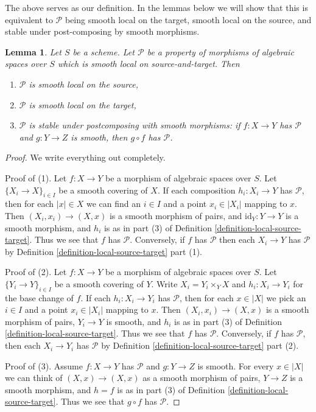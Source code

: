 \documentclass{stacks-project}
\theoremstyle{plain}
\newtheorem{lemma}[subsection]{Lemma}
\theoremstyle{definition}
\theoremstyle{remark}
\numberwithin{equation}{subsection}
\begin{document}
\noindent
The above serves as our definition. In the lemmas below we will show that
this is equivalent to $\mathcal{P}$ being smooth local on the target,
smooth local on the source, and stable under post-composing by smooth morphisms.

\begin{lemma}
\label{lemma-local-source-target-implies}
Let $S$ be a scheme.
Let $\mathcal{P}$ be a property of morphisms of algebraic spaces over $S$
which is smooth local on source-and-target. Then
\begin{enumerate}
\item $\mathcal{P}$ is smooth local on the source,
\item $\mathcal{P}$ is smooth local on the target,
\item $\mathcal{P}$ is stable under postcomposing with smooth morphisms:
if $f : X \to Y$ has $\mathcal{P}$ and $g : Y \to Z$ is smooth, then
$g \circ f$ has $\mathcal{P}$.
\end{enumerate}
\end{lemma}

\begin{proof}
We write everything out completely.

\medskip\noindent
Proof of (1). Let $f : X \to Y$ be a morphism of algebraic spaces over $S$.
Let $\{X_i \to X\}_{i \in I}$ be a smooth covering of $X$. If each composition
$h_i : X_i \to Y$ has $\mathcal{P}$, then for each $|x| \in X$ we can find
an $i \in I$ and a point $x_i \in |X_i|$ mapping to $x$. Then
$(X_i, x_i) \to (X, x)$ is a smooth morphism of pairs, and
$\text{id}_Y : Y \to Y$ is a smooth morphism, and $h_i$ is as in part (3) of
Definition \ref{definition-local-source-target}.
Thus we see that $f$ has $\mathcal{P}$.
Conversely, if $f$ has $\mathcal{P}$ then each $X_i \to Y$ has
$\mathcal{P}$ by
Definition \ref{definition-local-source-target} part (1).

\medskip\noindent
Proof of (2). Let $f : X \to Y$ be a morphism of algebraic spaces over $S$.
Let $\{Y_i \to Y\}_{i \in I}$ be a smooth covering of $Y$.
Write $X_i = Y_i \times_Y X$ and $h_i : X_i \to Y_i$ for the base change
of $f$.  If each  $h_i : X_i \to Y_i$ has $\mathcal{P}$, then for each
$x \in |X|$ we pick an $i \in I$ and a point $x_i \in |X_i|$ mapping to $x$.
Then $(X_i, x_i) \to (X, x)$ is a smooth morphism of pairs, $Y_i \to Y$ is
smooth, and $h_i$ is as in part (3) of
Definition \ref{definition-local-source-target}.
Thus we see that $f$ has $\mathcal{P}$.
Conversely, if $f$ has $\mathcal{P}$, then each $X_i \to Y_i$ has
$\mathcal{P}$ by
Definition \ref{definition-local-source-target} part (2).

\medskip\noindent
Proof of (3). Assume $f : X \to Y$ has $\mathcal{P}$ and $g : Y \to Z$ is
smooth. For every $x \in |X|$ we can think of $(X, x) \to (X, x)$ as a
smooth morphism of pairs, $Y \to Z$ is a smooth morphism, and $h = f$ is as
in part (3) of
Definition \ref{definition-local-source-target}.
Thus we see that $g \circ f$ has $\mathcal{P}$.
\end{proof}
\end{document}
